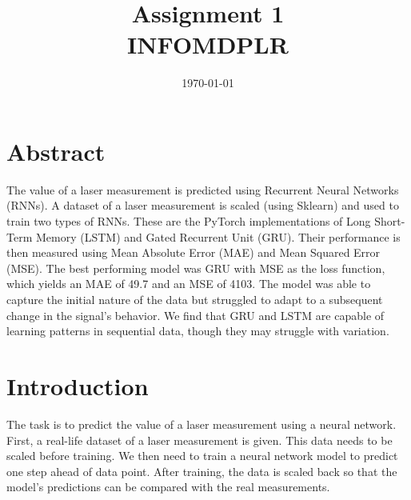 \documentclass[conference]{IEEEtran}
\begin{document}
\title{Assignment 1\\INFOMDPLR}
\author{
	\and
	\and
	\and
}
\date{\today}
\maketitle

\section{Abstract}
The value of a laser measurement is predicted using Recurrent Neural Networks (RNNs).
A dataset of a laser measurement is scaled (using Sklearn) and used to train two types of RNNs.
These are the PyTorch implementations of Long Short-Term Memory (LSTM) and Gated Recurrent Unit (GRU).
Their performance is then measured using Mean Absolute Error (MAE) and Mean Squared Error (MSE).
The best performing model was GRU with MSE as the loss function, which yields an MAE of 49.7 and an MSE of 4103.
The model was able to capture the initial nature of the data but struggled to adapt to a subsequent change in the signal's behavior.
We find that GRU and LSTM are capable of learning patterns in sequential data, though they may struggle with variation.

\section{Introduction}
The task is to predict the value of a laser measurement using a neural network.
First, a real-life dataset of a laser measurement is given.
This data needs to be scaled before training.
We then need to train a neural network model to predict one step ahead of data point.
After training, the data is scaled back so that the model's predictions can be compared with the real measurements.

\end{document}
